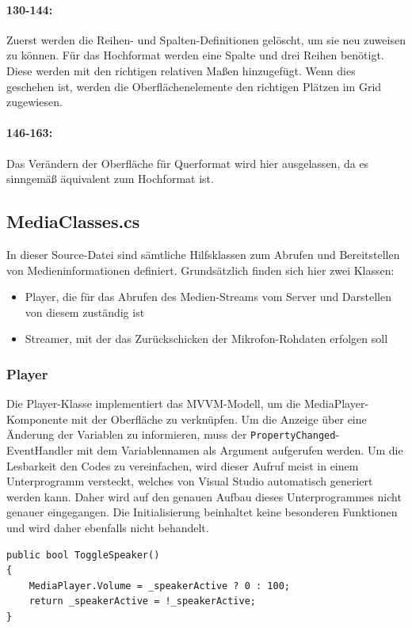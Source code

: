 \paragraph{130-144:} Zuerst werden die Reihen- und Spalten-Definitionen gelöscht, um sie neu zuweisen zu können.
Für das Hochformat werden eine Spalte und drei Reihen benötigt.
Diese werden mit den richtigen relativen Maßen hinzugefügt.
Wenn dies geschehen ist, werden die Oberflächenelemente den richtigen Plätzen im Grid zugewiesen.
\paragraph{146-163:} Das Verändern der Oberfläche für Querformat wird hier ausgelassen, da es sinngemäß äquivalent zum Hochformat ist.
\subsection{MediaClasses.cs}
\label{ssec:classes}
In dieser Source-Datei sind sämtliche Hilfsklassen zum Abrufen und Bereitstellen von Medieninformationen definiert.
Grundsätzlich finden sich hier zwei Klassen:
\begin{itemize}
    \item Player, die für das Abrufen des Medien-Streams vom Server und Darstellen von diesem zuständig ist
    \item Streamer, mit der das Zurückschicken der Mikrofon-Rohdaten erfolgen soll
\end{itemize}
\subsubsection{Player}
Die Player-Klasse implementiert das MVVM-Modell, um die MediaPlayer-Komponente mit der Oberfläche zu verknüpfen.
Um die Anzeige über eine Änderung der Variablen zu informieren, muss der \texttt{PropertyChanged}-EventHandler mit dem Variablennamen als Argument aufgerufen werden.
Um die Lesbarkeit den Codes zu vereinfachen, wird dieser Aufruf meist in einem Unterprogramm versteckt, welches von Visual Studio automatisch generiert werden kann.
Daher wird auf den genauen Aufbau dieses Unterprogrammes nicht genauer eingegangen.
Die Initialisierung beinhaltet keine besonderen Funktionen und wird daher ebenfalls nicht behandelt.

\begin{verbatim}
public bool ToggleSpeaker()
{
    MediaPlayer.Volume = _speakerActive ? 0 : 100;
    return _speakerActive = !_speakerActive;
}
\end{verbatim}
